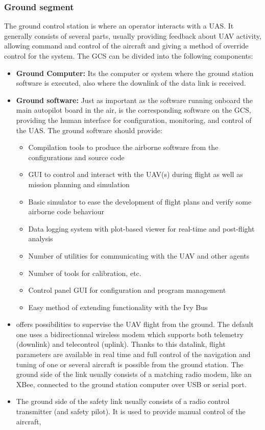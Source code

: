 \subsubsection{Ground segment} 
The ground control station is where an operator interacts with a UAS. It generally consists of several parts, usually providing feedback about UAV activity, allowing command and control of the aircraft and giving a method of override control for the system.
The GCS can be divided into the following components:
\begin{itemize}
    \item \textbf{Ground Computer:} Its the computer or system where the ground station software is executed, also where the downlink of the data link is received.
    \item \textbf{Ground software:} Just as important as the software running onboard the main autopilot board in the air, is the corresponding software on the GCS, providing the human interface for configuration, monitoring, and control of the UAS. The ground software should provide:
    \begin{itemize}
        \item Compilation tools to produce the airborne software from the configurations and source code
        \item GUI to control and interact with the UAV(s) during flight as well as mission planning and simulation
        \item Basic simulator to ease the development of flight plans and verify some airborne code behaviour
        \item Data logging system with plot-based viewer for real-time and post-flight analysis
        \item Number of utilities for communicating with the UAV and other agents
        \item Number of tools for calibration, etc.
        \item Control panel GUI for configuration and program management
        \item Easy method of extending functionality with the Ivy Bus
    \end{itemize}
    \item {} offers possibilities to supervise the UAV flight from the ground. The default one uses a bidirectionnal wireless modem which supports both telemetry (downlink) and telecontrol (uplink). Thanks to this datalink, flight parameters are available in real time and full control of the navigation and tuning of one or several aircraft is possible from the ground station. The ground side of the link usually consists of a matching radio modem, like an XBee, connected to the ground station computer over USB or serial port.
    \item {} The ground side of the safety link usually consists of a radio control transmitter (and safety pilot). It is used to provide manual control of the aircraft,
\end{itemize}


